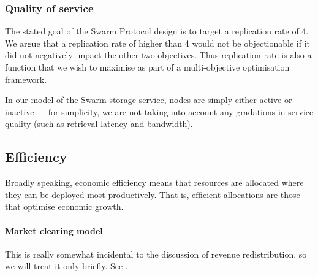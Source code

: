 \subsubsection{Quality of service}

The stated goal of the Swarm Protocol design is to target a replication rate of 4.
%
We argue that a replication rate of higher than 4 would not be objectionable if it did not negatively impact the other two objectives.
%
Thus replication rate is also a function that we wish to maximise as part of a multi-objective optimisation framework.

In our model of the Swarm storage service, nodes are simply either active or inactive --- for simplicity, we are not taking into account any gradations in service quality (such as retrieval latency and bandwidth).

\subsection{Efficiency}
\label{section:efficiency}

Broadly speaking, economic efficiency means that resources are allocated where they can be deployed most productively.
%
That is, efficient allocations are those that optimise economic growth.

%


%



\paragraph{Market clearing model} This is really somewhat incidental to the discussion of revenue redistribution, so we will treat it only briefly. See \cite[\S10]{mascollel1995microeconomic}.

